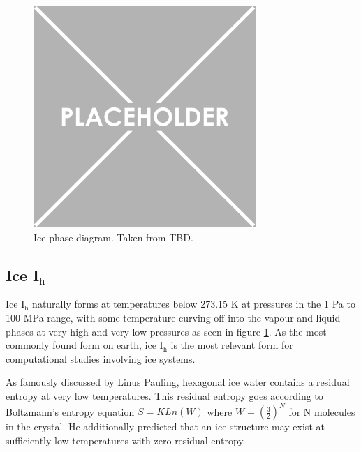 \begin{figure}
	
	\centering
	
	\includegraphics[width=0.75\textwidth]{placeholder.png}
	
	\caption{Ice phase diagram. Taken from TBD.}
	
	\label{fig:icePhases}
	
\end{figure}

\subsection{Ice I$_{\mathrm{h}}$}

Ice I$_{\mathrm{h}}$ naturally forms at temperatures below 273.15 K at pressures in the 1 Pa to 100 MPa range, with some temperature curving off into the vapour and liquid phases at very high and very low pressures as seen in figure \ref{fig:icePhases}.
As the most commonly found form on earth, ice I$_{\mathrm{h}}$ is the most relevant form for computational studies involving ice systems.

As famously discussed by Linus Pauling, hexagonal ice water contains a residual entropy at very low temperatures.\cite{PaulingIce} 
This residual entropy goes according to Boltzmann's entropy equation $S=KLn(W)$ where $W=(\frac{3}{2})^{N}$ for N molecules in the crystal.
He additionally predicted that an ice structure may exist at sufficiently low temperatures with zero residual entropy.


